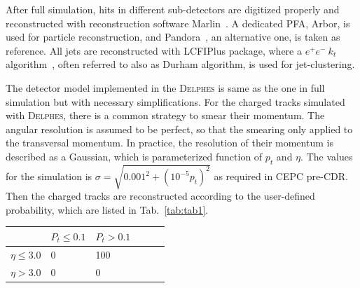 \documentclass[a4paper,10pt,twoside]{cpc-hepnp}
\begin{document}

After full simulation,  hits in different sub-detectors are digitized properly and reconstructed with reconstruction software  Marlin{~\cite{ref:marlin}}.   A dedicated PFA, Arbor\cite{ref:arbor},  is used for particle reconstruction, and Pandora{~\cite{ref:pandora}}, an alternative one, is taken as reference. All jets are reconstructed with LCFIPlus package\cite{ref:lcfiplus}, where a $e^+e^-~k_t$ algorithm{~\cite{ref:eekt}},  often referred to also as {\sf Durham} algorithm,  is used for jet-clustering. 

The detector model implemented in the {\textsc{Delphes}} is same as the one in full simulation but with necessary simplifications. For the charged tracks simulated with {\textsc{Delphes}}, there is a common strategy to smear their momentum. The angular resolution is assumed to be perfect, so that the smearing only applied to the transversal momentum. In practice, the resolution of their momentum is described as a Gaussian, which is parameterized function of $p_t$ and $\eta$. The values for the simulation is $\sigma=\sqrt{0.001^2+(10^{-5}p_t)^2}$ as required in CEPC pre-CDR. Then the charged tracks are  reconstructed according to the user-defined probability, which are listed in Tab.~\ref{tab:tab1}.

\begin{center}
\begin{tabular}{@{}*{3}{ll}}
\hline \hline
		& $P_t\le0.1$ & $P_t>0.1$ \\ \hline\hline
$\eta\le3.0$  & 0 		     & 100  \\
$\eta>3.0$    & 0 		     & 0 \\
\hline \hline
\end{tabular}
\end{center}
\end{document}
